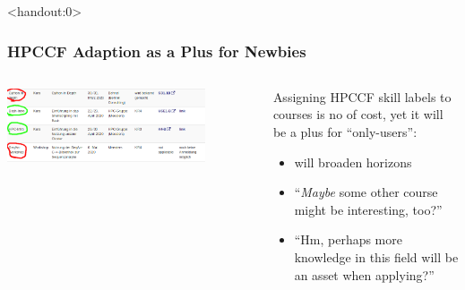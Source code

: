 \begin{frame}<handout:0>
  \frametitle{HPCCF Adaption as a Plus for Newbies}
  \begin{columns}
   \begin{column}{0.5\textwidth}
    \centering
    \includegraphics[width=0.8\textwidth]{images/linking_skills_users}\\
   \end{column}
   \begin{column}{0.5\textwidth}
     Assigning HPCCF skill labels to courses is no of cost, yet it will be a plus for ``only-users'':
     \begin{itemize}
      \item will broaden horizons
      \item ``\emph{Maybe} some other course might be interesting, too?''
      \item ``Hm, perhaps more knowledge in this field will be an asset when applying?''
     \end{itemize}
   \end{column}
  \end{columns}
\end{frame}


